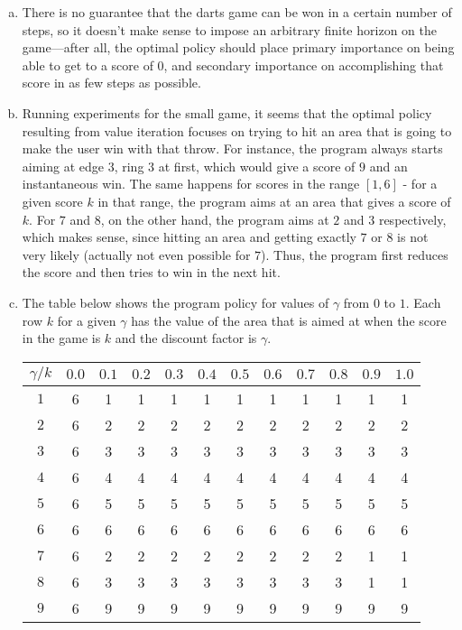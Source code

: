 \documentclass{article}
\begin{document}
\begin{enumerate}
\begin{enumerate}[(a)]
                \item There is no guarantee that the darts game can be won in a certain number of steps, so it doesn't make sense to impose an arbitrary finite horizon on the game---after all, the optimal policy should place primary importance on being able to get to a score of 0, and secondary importance on accomplishing that score in as few steps as possible.
                \item Running experiments for the small game, it seems that the optimal policy resulting from value iteration focuses on trying to hit an area that is going to make the user win with that throw. For instance, the program always starts aiming at edge $3$, ring $3$ at first, which would give a score of $9$ and an instantaneous win. The same happens for scores in the range $[1,6]$ - for a given score $k$ in that range, the program aims at an area that gives a score of $k$. For $7$ and $8$, on the other hand, the program aims at $2$ and $3$ respectively, which makes sense, since hitting an area and getting exactly $7$ or $8$ is not very likely (actually not even possible for $7$). Thus, the program first reduces the score and then tries to win in the next hit.
                
                \item The table below shows the program policy for values of $\gamma$ from $0$ to $1$. Each row $k$ for a given $\gamma$ has the value of the area that is aimed at when the score in the game is $k$ and the discount factor is $\gamma$.
                
\begin{center} \begin{tabular}[h]{|c|c|c|c|c|c|c|c|c|c|c|c|} \hline
$\gamma/k$ & $0.0$ & $0.1$ & $0.2$ & $0.3$ & $0.4$ & $0.5$ & $0.6$ & $0.7$ & $0.8$ & $0.9$ & $1.0$ \\ \hline
$1$ & 6 & 1 & 1 & 1 & 1 & 1 & 1 & 1 & 1 & 1 & 1 \\
$2$ & 6 & 2 & 2 & 2 & 2 & 2 & 2 & 2 & 2 & 2 & 2 \\
$3$ & 6 & 3 & 3 & 3 & 3 & 3 & 3 & 3 & 3 & 3 & 3 \\
$4$ & 6 & 4 & 4 & 4 & 4 & 4 & 4 & 4 & 4 & 4 & 4 \\
$5$ & 6 & 5 & 5 & 5 & 5 & 5 & 5 & 5 & 5 & 5 & 5 \\
$6$ & 6 & 6 & 6 & 6 & 6 & 6 & 6 & 6 & 6 & 6 & 6 \\
$7$ & 6 & 2 & 2 & 2 & 2 & 2 & 2 & 2 & 2 & 1 & 1 \\
$8$ & 6 & 3 & 3 & 3 & 3 & 3 & 3 & 3 & 3 & 1 & 1 \\
$9$ & 6 & 9 & 9 & 9 & 9 & 9 & 9 & 9 & 9 & 9 & 9 \\ \hline
\end{tabular} \end{center}


\end{enumerate}
\end{enumerate}
\end{document}
